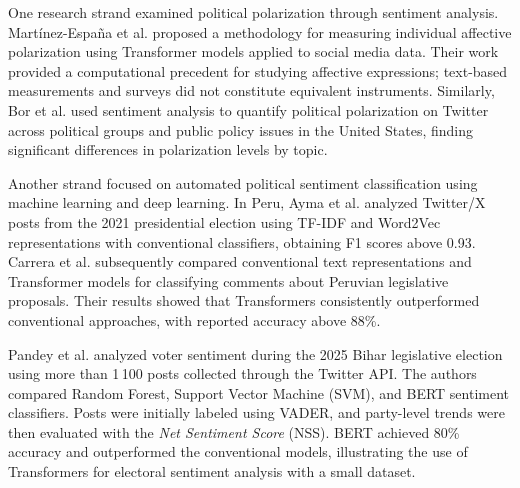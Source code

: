 \documentclass[conference,letterpaper]{IEEEtran}
\begin{document}
One research strand examined political polarization through sentiment analysis. Martínez-España et al. \cite{polariz} proposed a methodology for measuring individual affective polarization using Transformer models applied to social media data. Their work provided a computational precedent for studying affective expressions; text-based measurements and surveys did not constitute equivalent instruments. Similarly, Bor et al. \cite{bor2023} used sentiment analysis to quantify political polarization on Twitter across political groups and public policy issues in the United States, finding significant differences in polarization levels by topic.

Another strand focused on automated political sentiment classification using machine learning and deep learning. In Peru, Ayma et al. \cite{Ayma2024} analyzed Twitter/X posts from the 2021 presidential election using TF-IDF and Word2Vec representations with conventional classifiers, obtaining F1 scores above 0.93. Carrera et al. \cite{Carrera2026} subsequently compared conventional text representations and Transformer models for classifying comments about Peruvian legislative proposals. Their results showed that Transformers consistently outperformed conventional approaches, with reported accuracy above 88\%.

Pandey et al. \cite{pandey2025twitter} analyzed voter sentiment during the 2025 Bihar legislative election using more than 1\,100 posts collected through the Twitter API. The authors compared Random Forest, Support Vector Machine (SVM), and BERT sentiment classifiers. Posts were initially labeled using VADER, and party-level trends were then evaluated with the \textit{Net Sentiment Score} (NSS). BERT achieved 80\% accuracy and outperformed the conventional models, illustrating the use of Transformers for electoral sentiment analysis with a small dataset.

\end{document}
